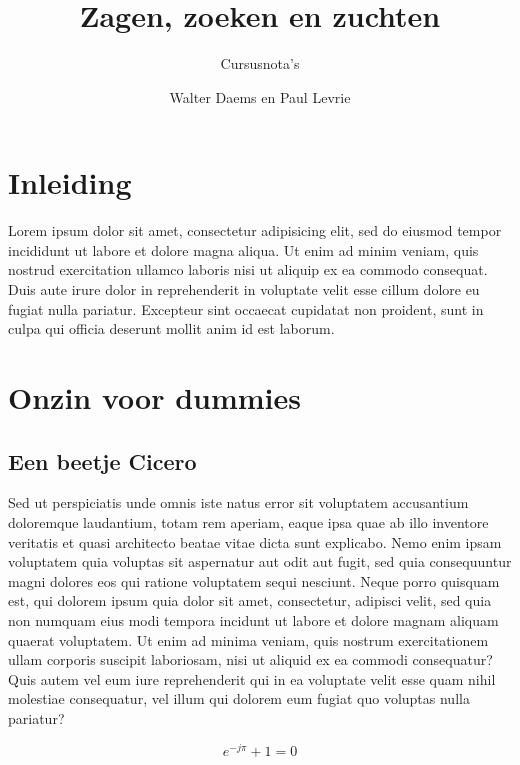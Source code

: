 \documentclass[a4paper,11pt,oneside,openright,english,copyright]{kdgcoursetext}
\title{Zagen, zoeken en zuchten}
\subtitle{Cursusnota's}
\author{Walter Daems en Paul Levrie}
\begin{document}

\maketitle

\frontmatter

\tableofcontents

\mainmatter
\chapter*{Inleiding}
Lorem ipsum dolor sit amet, consectetur adipisicing elit, sed do
eiusmod tempor incididunt ut labore et dolore magna aliqua. Ut enim ad
minim veniam, quis nostrud exercitation ullamco laboris nisi ut
aliquip ex ea commodo consequat. Duis aute irure dolor in
reprehenderit in voluptate velit esse cillum dolore eu fugiat nulla
pariatur. Excepteur sint occaecat cupidatat non proident, sunt in
culpa qui officia deserunt mollit anim id est laborum.

\chapter{Onzin voor dummies}

\section{Een beetje Cicero}
Sed ut perspiciatis unde omnis iste natus error sit voluptatem
accusantium doloremque laudantium, totam rem aperiam, eaque ipsa quae
ab illo inventore veritatis et quasi architecto beatae vitae dicta
sunt explicabo. Nemo enim ipsam voluptatem quia voluptas sit
aspernatur aut odit aut fugit, sed quia consequuntur magni dolores eos
qui ratione voluptatem sequi nesciunt. Neque porro quisquam est, qui
dolorem ipsum quia dolor sit amet, consectetur, adipisci velit, sed
quia non numquam eius modi tempora incidunt ut labore et dolore magnam
aliquam quaerat voluptatem. Ut enim ad minima veniam, quis nostrum
exercitationem ullam corporis suscipit laboriosam, nisi ut aliquid ex
ea commodi consequatur? Quis autem vel eum iure reprehenderit qui in
ea voluptate velit esse quam nihil molestiae consequatur, vel illum
qui dolorem eum fugiat quo voluptas nulla pariatur?

\begin{equation}
  e^{-j\pi} + 1 = 0
\end{equation}
\end{document}
